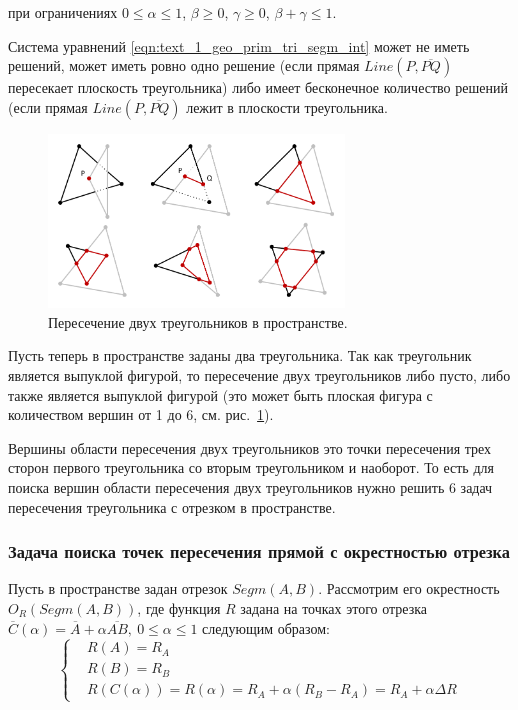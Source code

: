 при ограничениях $0 \le \alpha \le 1$, $\beta \ge 0$, $\gamma \ge 0$, $\beta + \gamma \le 1$.

Система уравнений \eqref{eqn:text_1_geo_prim_tri_segm_int} может не иметь решений, может иметь ровно одно решение (если прямая $Line(P, \overline{PQ})$ пересекает плоскость треугольника) либо имеет бесконечное количество решений (если прямая $Line(P, \overline{PQ})$ лежит в плоскости треугольника.

\begin{figure}[ht]
\centering
\includegraphics[width=0.7\textwidth]{./pics/text_1_geo_prim/tri_tri.pdf}
\caption{Пересечение двух треугольников в пространстве.}
\label{fig:text_1_geo_prim_tri_tri}
\end{figure}

Пусть теперь в пространстве заданы два треугольника.
Так как треугольник является выпуклой фигурой, то пересечение двух треугольников либо пусто, либо также является выпуклой фигурой (это может быть плоская фигура с количеством вершин от 1 до 6, см. рис.~\ref{fig:text_1_geo_prim_tri_tri}).

Вершины области пересечения двух треугольников это точки пересечения трех сторон первого треугольника со вторым треугольником и наоборот.
То есть для поиска вершин области пересечения двух треугольников нужно решить 6 задач пересечения треугольника с отрезком в пространстве.

\subsubsection{Задача поиска точек пересечения прямой с окрестностью отрезка}\label{sec:text_1_geo_prim_line_eps_intersect}

Пусть в пространстве задан отрезок $Segm(A, B)$.
Рассмотрим его окрестность $O_R(Segm(A, B))$, где функция $R$ задана на точках этого отрезка $\overline{C}(\alpha) = \overline{A} + \alpha \overline{AB}, \ 0 \le \alpha \le 1$ следующим образом:
\begin{equation}
	\left\{
		\begin{aligned}
			& R(A) = R_A \\
			& R(B) = R_B \\
			& R(C(\alpha)) = R(\alpha) = R_A + \alpha (R_B - R_A) = R_A + \alpha \Delta R
		\end{aligned}
	\right.
\end{equation}

